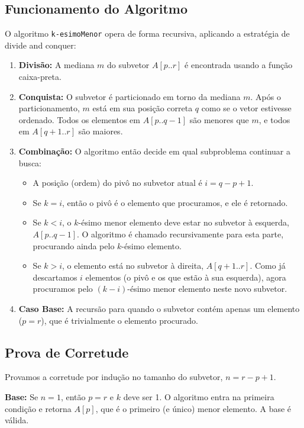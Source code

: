 \documentclass[a4paper,12pt]{article}
\begin{document}
\subsection*{Funcionamento do Algoritmo}
O algoritmo \texttt{k-esimoMenor} opera de forma recursiva, aplicando a estratégia de divide and conquer:
\begin{enumerate}
    \item \textbf{Divisão:} A mediana $m$ do subvetor $A[p..r]$ é encontrada usando a função caixa-preta.
    \item \textbf{Conquista:} O subvetor é particionado em torno da mediana $m$. Após o particionamento, $m$ está em sua posição correta $q$ como se o vetor estivesse ordenado. Todos os elementos em $A[p..q-1]$ são menores que $m$, e todos em $A[q+1..r]$ são maiores.
    \item \textbf{Combinação:} O algoritmo então decide em qual subproblema continuar a busca:
    \begin{itemize}
        \item A posição (ordem) do pivô no subvetor atual é $i = q - p + 1$.
        \item Se $k=i$, então o pivô é o elemento que procuramos, e ele é retornado.
        \item Se $k < i$, o $k$-ésimo menor elemento deve estar no subvetor à esquerda, $A[p..q-1]$. O algoritmo é chamado recursivamente para esta parte, procurando ainda pelo $k$-ésimo elemento.
        \item Se $k > i$, o elemento está no subvetor à direita, $A[q+1..r]$. Como já descartamos $i$ elementos (o pivô e os que estão à sua esquerda), agora procuramos pelo $(k-i)$-ésimo menor elemento neste novo subvetor.
    \end{itemize}
    \item \textbf{Caso Base:} A recursão para quando o subvetor contém apenas um elemento ($p=r$), que é trivialmente o elemento procurado.
\end{enumerate}

\subsection*{Prova de Corretude}
Provamos a corretude por indução no tamanho do subvetor, $n = r - p + 1$.

\textbf{Base:} Se $n=1$, então $p=r$ e $k$ deve ser 1. O algoritmo entra na primeira condição e retorna $A[p]$, que é o primeiro (e único) menor elemento. A base é válida.
\end{document}

